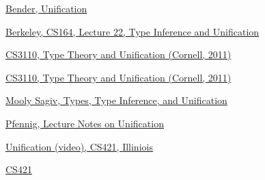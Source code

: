 \begin{thebibliography}

 \href{https://www.cs.unh.edu/~ruml/cs730/unification.pdf}{Bender, Unification}

 \href{https://inst.eecs.berkeley.edu/~cs164/sp11/lectures/lecture22.pdf}{Berkeley, CS164, Lecture 22, Type Inference and Unification} $\quad$ 

 \href{https://www.cs.cornell.edu/courses/cs3110/2011sp/Lectures/lec26-type-inference/type-inference.htm}{CS3110, Type Theory and Unification (Cornell, 2011)} $\quad$ 

 \href{https://www.cs.cornell.edu/courses/cs6110/2017sp/lectures/lec23.pdf}{CS3110, Type Theory and Unification (Cornell, 2011)} 

 \href{http://www.cs.tau.ac.il/~msagiv/courses/pl16/types.pdf}{Mooly Sagiv, Types, Type Inference, and Unification} $\quad$ 

 \href{https://www.cs.cmu.edu/~fp/courses/15816-s12/lectures/19-unif.pdf}{Pfennig, Lecture Notes on Unification}

 \href{https://pages.github-dev.cs.illinois.edu/cs421-sp18/web/videos/unification/}{Unification (video), CS421, Illiniois}

 \href{https://pages.github-dev.cs.illinois.edu/cs421-sp18/web/pages/lectures/}{CS421}

\end{thebibliography}
